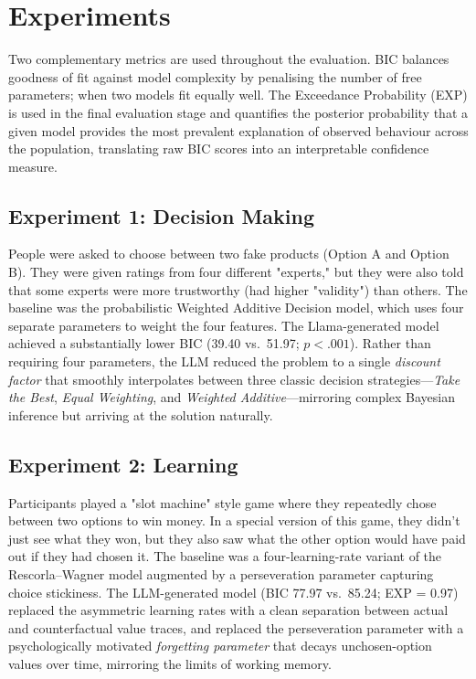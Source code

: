 \section{Experiments}

Two complementary metrics are used throughout the evaluation. BIC balances goodness of fit against model complexity by penalising the number of free parameters; when two models fit equally well. The Exceedance Probability (EXP) is used in the final evaluation stage and quantifies the posterior probability that a given model provides the most prevalent explanation of observed behaviour across the population, translating raw BIC scores into an interpretable confidence measure.

\subsection{Experiment 1: Decision Making}

People were asked to choose between two fake products (Option A and Option B). They were given ratings from four different "experts," but they were also told that some experts were more trustworthy (had higher "validity") than others. The baseline was the probabilistic Weighted Additive Decision model, which uses four separate parameters to weight the four features. The Llama-generated model achieved a substantially lower BIC (39.40 vs.\ 51.97; $p < .001$). Rather than requiring four parameters, the LLM reduced the problem to a single \emph{discount factor} that smoothly interpolates between three classic decision strategies---\emph{Take the Best}, \emph{Equal Weighting}, and \emph{Weighted Additive}---mirroring complex Bayesian inference but arriving at the solution naturally.

\subsection{Experiment 2: Learning}

Participants played a "slot machine" style game where they repeatedly chose between two options to win money. In a special version of this game, they didn't just see what they won, but they also saw what the other option would have paid out if they had chosen it. The baseline was a four-learning-rate variant of the Rescorla--Wagner model augmented by a perseveration parameter capturing choice stickiness. The LLM-generated model (BIC 77.97 vs.\ 85.24; EXP = 0.97) replaced the asymmetric learning rates with a clean separation between actual and counterfactual value traces, and replaced the perseveration parameter with a psychologically motivated \emph{forgetting parameter} that decays unchosen-option values over time, mirroring the limits of working memory.

